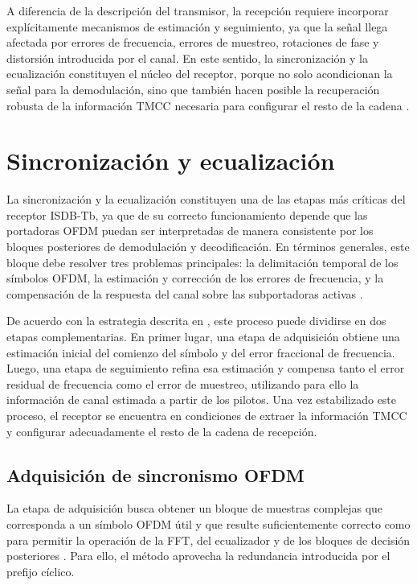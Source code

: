 A diferencia de la descripción del transmisor, la recepción requiere incorporar explícitamente mecanismos de estimación y seguimiento, ya que la señal llega afectada por errores de frecuencia, errores de muestreo, rotaciones de fase y distorsión introducida por el canal. En este sentido, la sincronización y la ecualización constituyen el núcleo del receptor, porque no solo acondicionan la señal para la demodulación, sino que también hacen posible la recuperación robusta de la información TMCC necesaria para configurar el resto de la cadena \cite{uruguay_rx}.

\section{Sincronización y ecualización}
\label{sec:isdbtb_sync_eq}

La sincronización y la ecualización constituyen una de las etapas más críticas del receptor ISDB-Tb, ya que de su correcto funcionamiento depende que las portadoras OFDM puedan ser interpretadas de manera consistente por los bloques posteriores de demodulación y decodificación. En términos generales, este bloque debe resolver tres problemas principales: la delimitación temporal de los símbolos OFDM, la estimación y corrección de los errores de frecuencia, y la compensación de la respuesta del canal sobre las subportadoras activas \cite{uruguay_rx}.

De acuerdo con la estrategia descrita en \cite{uruguay_rx}, este proceso puede dividirse en dos etapas complementarias. En primer lugar, una etapa de adquisición obtiene una estimación inicial del comienzo del símbolo y del error fraccional de frecuencia. Luego, una etapa de seguimiento refina esa estimación y compensa tanto el error residual de frecuencia como el error de muestreo, utilizando para ello la información de canal estimada a partir de los pilotos. Una vez estabilizado este proceso, el receptor se encuentra en condiciones de extraer la información TMCC y configurar adecuadamente el resto de la cadena de recepción.

\subsection{Adquisición de sincronismo OFDM}

La etapa de adquisición busca obtener un bloque de muestras complejas que corresponda a un símbolo OFDM útil y que resulte suficientemente correcto como para permitir la operación de la FFT, del ecualizador y de los bloques de decisión posteriores \cite{uruguay_rx}. Para ello, el método aprovecha la redundancia introducida por el prefijo cíclico.


